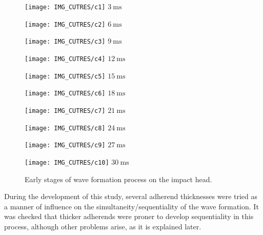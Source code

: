 \documentclass[cmfonts]{witpress}
\begin{document}
\begin{figure}
	\centering
	\begin{minipage}[b]{.15\linewidth}
		\centering
		\texttt{[image: IMG\_CUTRES/c1]}
		$\SI{3}{\ms}$
	\end{minipage}
	\quad
	\begin{minipage}[b]{.15\linewidth}
		\centering
		\texttt{[image: IMG\_CUTRES/c2]}
		$\SI{6}{\ms}$
	\end{minipage}
	\quad
	\begin{minipage}[b]{.15\linewidth}
		\centering
		\texttt{[image: IMG\_CUTRES/c3]}
		$\SI{9}{\ms}$
	\end{minipage}
	\quad
	\begin{minipage}[b]{.15\linewidth}
		\centering
		\texttt{[image: IMG\_CUTRES/c4]}
		$\SI{12}{\ms}$
	\end{minipage}
	\quad
	\begin{minipage}[b]{.15\linewidth}
		\centering
		\texttt{[image: IMG\_CUTRES/c5]}
		$\SI{15}{\ms}$
	\end{minipage}
	\quad
	\begin{minipage}[b]{.15\linewidth}
		\centering
		\texttt{[image: IMG\_CUTRES/c6]}
		$\SI{18}{\ms}$
	\end{minipage}
	\quad
	\begin{minipage}[b]{.15\linewidth}
		\centering
		\texttt{[image: IMG\_CUTRES/c7]}
		$\SI{21}{\ms}$
	\end{minipage}
	\quad
	\begin{minipage}[b]{.15\linewidth}
		\centering
		\texttt{[image: IMG\_CUTRES/c8]}
		$\SI{24}{\ms}$
	\end{minipage}
	\quad
	\begin{minipage}[b]{.15\linewidth}
		\centering
		\texttt{[image: IMG\_CUTRES/c9]}
		$\SI{27}{\ms}$
	\end{minipage}
	\quad
	\begin{minipage}[b]{.15\linewidth}
		\centering
		\texttt{[image: IMG\_CUTRES/c10]}
		$\SI{30}{\ms}$
	\end{minipage}
\caption{Early stages of wave formation process on the impact head.}
\label{fig:wave_form}
\end{figure}

During the development of this study, several adherend thicknesses were tried as a manner of influence on the simultaneity/sequentiality of the wave formation. It was checked that thicker adherends were proner to develop sequentiality in this process, although other problems arise, as it is explained later.
\end{document}
